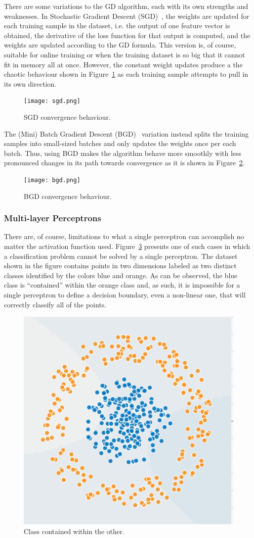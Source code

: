 There are some variations to the GD algorithm, each with its own strengths and
weaknesses. In Stochastic Gradient Descent (SGD)~\cite{gradient_descent}, the weights are updated for
each training sample in the dataset, i.e. the output of one feature vector is
obtained, the derivative of the loss function for that output is computed, and
the weights are updated according to the GD formula. This version is, of course,
suitable for online training or when the training dataset is so big that it
cannot fit in memory all at once. However, the constant weight updates produce a
the chaotic behaviour shown in Figure~\ref{fig:sgd} as each training sample
attempts to pull in its own direction.

\begin{figure}[!htbp]
    \centering
    \texttt{[image: sgd.png]}
    \caption{SGD convergence behaviour.}
    \label{fig:sgd}
\end{figure}

The (Mini) Batch Gradient Descent (BGD)~\cite{gradient_descent} variation instead splits the training
samples into small-sized batches and only updates the weights once per each
batch. Thus, using BGD makes the algorithm behave more smoothly with less
pronounced changes in its path towards convergence as it is shown in
Figure~\ref{fig:bgd}.

\begin{figure}[!htbp]
    \centering
    \texttt{[image: bgd.png]}
    \caption{BGD convergence behaviour.}
    \label{fig:bgd}
\end{figure}

\subsubsection{Multi-layer Perceptrons}

There are, of course, limitations to what a single perceptron can accomplish no
matter the activation function used. Figure~\ref{fig:unsolvable} presents one of
such cases in which a classification problem cannot be solved by a single
perceptron. The dataset shown in the figure contains points in two dimensions
labeled as two distinct classes identified by the colors blue and orange. As can
be observed, the blue class is ``contained'' within the orange class and, as
such, it is impossible for a single perceptron to define a decision boundary,
even a non-linear one, that will correctly classify all of the points. 

\begin{figure}[!htbp]
    \centering
    \includegraphics[width=.35\textwidth]{Images/circles.png}
    \caption{Class contained within the other.}
    \label{fig:unsolvable}
\end{figure}

